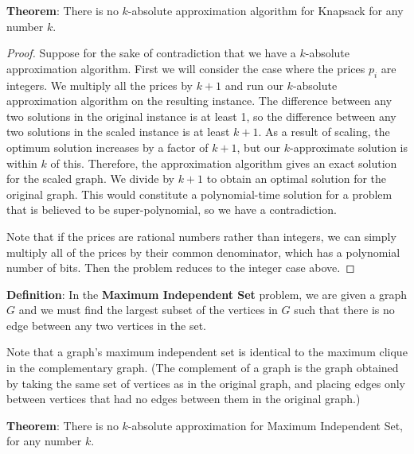 \documentclass{article}
\begin{document}
\textbf{Theorem}:
  There is no $k$-absolute approximation algorithm for
  Knapsack for any number $k$.

\begin{proof}
Suppose for the sake of contradiction that we have a $k$-absolute
approximation algorithm.  First we will consider the case where the
prices $p_i$ are integers.  We multiply all the prices by $k+1$ and
run our $k$-absolute approximation algorithm on the resulting
instance.  The difference between any two solutions in the original
instance is at least 1, so the difference between any two solutions in
the scaled instance is at least $k+1$.  As a result of scaling, the
optimum solution increases by a factor of $k+1$, but our
$k$-approximate solution is within $k$ of this.  Therefore, the
approximation algorithm gives an exact solution for the scaled graph.
We divide by $k+1$ to obtain an optimal solution for the original
graph.  This would constitute a polynomial-time solution for a problem
that is believed to be super-polynomial, so we have a contradiction.

Note that if the prices are rational numbers rather than integers, we
can simply multiply all of the prices by their common denominator,
which has a polynomial number of bits.  Then the problem reduces to
the integer case above.
\end{proof}

\textbf{Definition}:
In the \textbf{Maximum Independent Set} problem, we are given a graph
$G$ and we must find the largest subset of the vertices in $G$ such
that there is no edge between any two vertices in the set.

Note that a graph's maximum independent set is identical to the
maximum clique in the complementary graph.  (The complement of a graph
is the graph obtained by taking the same set of vertices as in the
original graph, and placing edges only between vertices that had no
edges between them in the original graph.)

\textbf{Theorem}:
There is no $k$-absolute approximation for Maximum Independent Set,
for any number $k$.
\end{document}
